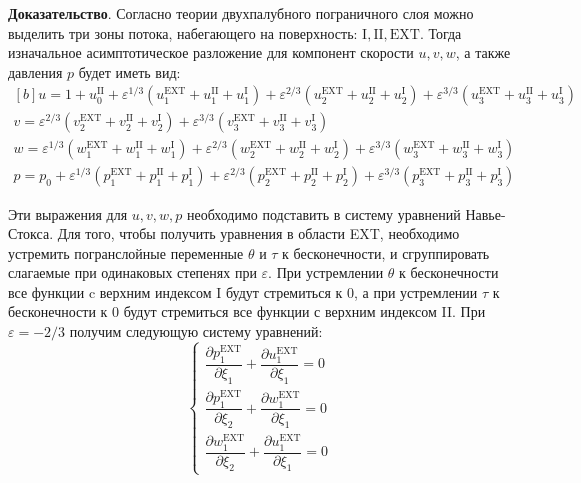 \documentclass[../master.tex]{subfiles}
\begin{document}
\textbf{Доказательство}. Согласно теории двухпалубного пограничного слоя можно выделить три зоны потока, набегающего на поверхность: $\text{I}, \text{II}, \text{EXT}$. Тогда изначальное асимптотическое разложение для компонент скорости $u, v, w$, а также давления $p$ будет иметь вид:
\begin{equation}
  \begin{gathered}[b]
	u = 1 + u_0^{\text{II}} + \varepsilon^{1/3}(u_1^{\text{EXT}}  +  u_1^{\text{II}} + u_1^{\text{I}}) + \varepsilon^{2/3} (u_2^{\text{EXT}} +  u_2^{\text{II}} + u_2^{\text{I}}) + \varepsilon^{3/3} (u_3^{\text{EXT}} +  u_3^{\text{II}} + u_3^{\text{I}}) \\
	v = \varepsilon^{2/3} (v_2^{\text{EXT}} +  v_2^{\text{II}} + v_2^{\text{I}}) + \varepsilon^{3/3} (v_3^{\text{EXT}} +  v_3^{\text{II}} + v_3^{\text{I}}) \\
	w = \varepsilon^{1/3}(w_1^{\text{EXT}}  +  w_1^{\text{II}} + w_1^{\text{I}}) + \varepsilon^{2/3} (w_2^{\text{EXT}} +  w_2^{\text{II}} + w_2^{\text{I}}) + \varepsilon^{3/3} (w_3^{\text{EXT}} +  w_3^{\text{II}} + w_3^{\text{I}}) \\
	p = p_0 + \varepsilon^{1/3}(p_1^{\text{EXT}}  +  p_1^{\text{II}} + p_1^{\text{I}}) + \varepsilon^{2/3} (p_2^{\text{EXT}} +  p_2^{\text{II}} + p_2^{\text{I}}) + \varepsilon^{3/3} (p_3^{\text{EXT}} +  p_3^{\text{II}} + p_3^{\text{I}})
  \end{gathered}
\end{equation}

Эти выражения для $u, v, w, p$ необходимо подставить в систему уравнений Навье-Стокса.
Для того, чтобы получить уравнения в области EXT, необходимо устремить погранслойные переменные $\theta$ и $\tau$ к бесконечности, и сгруппировать слагаемые при одинаковых степенях при $\varepsilon$. При устремлении $\theta$ к бесконечности все функции c верхним индексом I будут стремиться к 0, а при устремлении $\tau$ к бесконечности к 0 будут стремиться все функции с верхним индексом II.
При $\varepsilon=-2/3$ получим следующую систему уравнений:
\begin{equation}
	\begin{cases}
	\dfrac{\partial p_1^{\text{EXT}}}{\partial \xi_1} + \dfrac{\partial u_1^{\text{EXT}}}{\partial \xi_1} = 0 \\[2ex]
	\dfrac{\partial p_1^{\text{EXT}}}{\partial \xi_2} + \dfrac{\partial w_1^{\text{EXT}}}{\partial \xi_1} = 0 \\[2ex]
	\dfrac{\partial w_1^{\text{EXT}}}{\partial \xi_2} + \dfrac{\partial u_1^{\text{EXT}}}{\partial \xi_1} = 0
	\end{cases}
\end{equation}
\end{document}
